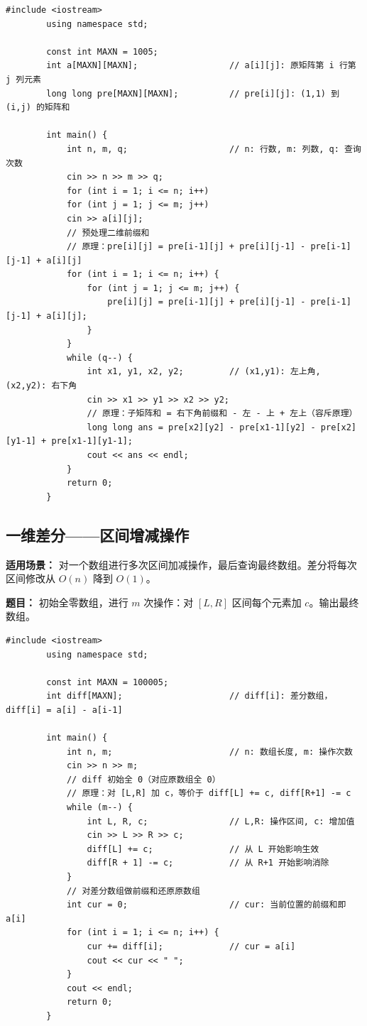 \documentclass[12pt,a4paper]{ctexart}
\begin{document}
	\begin{lstlisting}[caption={二维前缀和——O(1) 子矩阵和查询}]
		#include <iostream>
		using namespace std;
		
		const int MAXN = 1005;
		int a[MAXN][MAXN];                  // a[i][j]: 原矩阵第 i 行第 j 列元素
		long long pre[MAXN][MAXN];          // pre[i][j]: (1,1) 到 (i,j) 的矩阵和
		
		int main() {
			int n, m, q;                    // n: 行数, m: 列数, q: 查询次数
			cin >> n >> m >> q;
			for (int i = 1; i <= n; i++)
			for (int j = 1; j <= m; j++)
			cin >> a[i][j];
			// 预处理二维前缀和
			// 原理：pre[i][j] = pre[i-1][j] + pre[i][j-1] - pre[i-1][j-1] + a[i][j]
			for (int i = 1; i <= n; i++) {
				for (int j = 1; j <= m; j++) {
					pre[i][j] = pre[i-1][j] + pre[i][j-1] - pre[i-1][j-1] + a[i][j];
				}
			}
			while (q--) {
				int x1, y1, x2, y2;         // (x1,y1): 左上角, (x2,y2): 右下角
				cin >> x1 >> y1 >> x2 >> y2;
				// 原理：子矩阵和 = 右下角前缀和 - 左 - 上 + 左上（容斥原理）
				long long ans = pre[x2][y2] - pre[x1-1][y2] - pre[x2][y1-1] + pre[x1-1][y1-1];
				cout << ans << endl;
			}
			return 0;
		}
	\end{lstlisting}
	
	\subsection{一维差分——区间增减操作}
	\textbf{适用场景：} 对一个数组进行多次区间加减操作，最后查询最终数组。差分将每次区间修改从 \(O(n)\) 降到 \(O(1)\)。
	
	\textbf{题目：} 初始全零数组，进行 \(m\) 次操作：对 \([L,R]\) 区间每个元素加 \(c\)。输出最终数组。
	
	\begin{lstlisting}[caption={一维差分——O(1) 区间增减}]
		#include <iostream>
		using namespace std;
		
		const int MAXN = 100005;
		int diff[MAXN];                     // diff[i]: 差分数组，diff[i] = a[i] - a[i-1]
		
		int main() {
			int n, m;                       // n: 数组长度, m: 操作次数
			cin >> n >> m;
			// diff 初始全 0（对应原数组全 0）
			// 原理：对 [L,R] 加 c，等价于 diff[L] += c, diff[R+1] -= c
			while (m--) {
				int L, R, c;                // L,R: 操作区间, c: 增加值
				cin >> L >> R >> c;
				diff[L] += c;               // 从 L 开始影响生效
				diff[R + 1] -= c;           // 从 R+1 开始影响消除
			}
			// 对差分数组做前缀和还原原数组
			int cur = 0;                    // cur: 当前位置的前缀和即 a[i]
			for (int i = 1; i <= n; i++) {
				cur += diff[i];             // cur = a[i]
				cout << cur << " ";
			}
			cout << endl;
			return 0;
		}
	\end{lstlisting}
	
\end{document}
